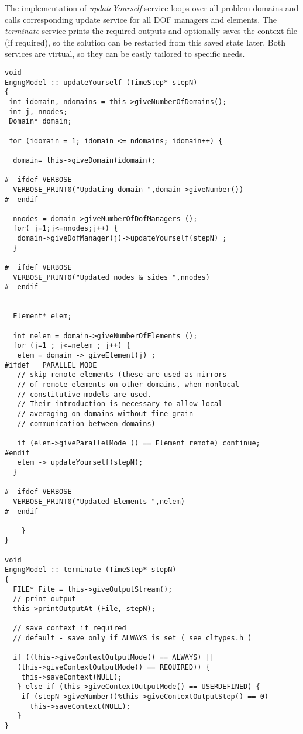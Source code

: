 \documentclass[12pt,draft]{article}
\newcommand{\service}[1]{{\em #1}}
\begin{document}
The implementation of \service{updateYourself} service loops over all
problem domains and calls corresponding update service for all DOF
managers and elements. The \service{terminate} service prints the
required outputs and optionally saves the
context file (if required), so the solution can be restarted from this
saved state later. Both services are virtual, so they can be easily
tailored to specific needs.

{\small\begin{verbatim}
void
EngngModel :: updateYourself (TimeStep* stepN)
{
 int idomain, ndomains = this->giveNumberOfDomains();
 int j, nnodes;
 Domain* domain;
  
 for (idomain = 1; idomain <= ndomains; idomain++) {

  domain= this->giveDomain(idomain);
		
#  ifdef VERBOSE
  VERBOSE_PRINT0("Updating domain ",domain->giveNumber())
#  endif
			
  nnodes = domain->giveNumberOfDofManagers ();
  for( j=1;j<=nnodes;j++) {
   domain->giveDofManager(j)->updateYourself(stepN) ;
  }
		
#  ifdef VERBOSE
  VERBOSE_PRINT0("Updated nodes & sides ",nnodes)
#  endif
			
			
  Element* elem;
  
  int nelem = domain->giveNumberOfElements ();
  for (j=1 ; j<=nelem ; j++) {
   elem = domain -> giveElement(j) ;
#ifdef __PARALLEL_MODE
   // skip remote elements (these are used as mirrors 
   // of remote elements on other domains, when nonlocal 
   // constitutive models are used. 
   // Their introduction is necessary to allow local 
   // averaging on domains without fine grain 
   // communication between domains)

   if (elem->giveParallelMode () == Element_remote) continue;
#endif
   elem -> updateYourself(stepN);
  }
		
#  ifdef VERBOSE
  VERBOSE_PRINT0("Updated Elements ",nelem)
#  endif
			
	}
}

void 
EngngModel :: terminate (TimeStep* stepN)
{
  FILE* File = this->giveOutputStream();
  // print output
  this->printOutputAt (File, stepN);

  // save context if required
  // default - save only if ALWAYS is set ( see cltypes.h )
		
  if ((this->giveContextOutputMode() == ALWAYS) ||
   (this->giveContextOutputMode() == REQUIRED)) {
    this->saveContext(NULL);
   } else if (this->giveContextOutputMode() == USERDEFINED) {
    if (stepN->giveNumber()%this->giveContextOutputStep() == 0) 
      this->saveContext(NULL);
   }
}
\end{verbatim}}
\end{document}
